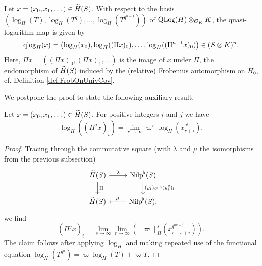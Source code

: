 \documentclass[../main.tex]{subfiles}
\begin{document}
\begin{prop}\label{prop:qlogmapExplicit}
  Let $x = (x_0, x_1, \dots) \in \Tilde H(S)$. With respect to the basis
  $(\log_H(T),\allowbreak \log_H(T^q), \allowbreak \dots, \allowbreak \log_H(T^{q^{n-1}}))$ of 
  $\QLog(H) \otimes_{\cO_K} K$, the quasi-logarithm map is given by
  \begin{equation*}
    \qlog_H(x) = \left(\log_H(x_0), \log_H((\Pi x)_0), \dots, \log_H((\Pi^{n-1}
    x)_0)\right) \in (S\otimes K)^n.
  \end{equation*}
  Here, $\Pi x = ((\Pi x)_0, (\Pi x)_1, \dots)$ is the image of $x$ under
  $\Pi$, the endomorphism of $\Tilde
  H(S)$ induced by the (relative) Frobenius automorphism on $H_0$, cf. Definition
  \ref{def:FrobOnUnivCov}.
\end{prop}
We postpone the proof to state the following auxiliary result.
\begin{lem}\label{lem:FrobOnTildeHExpl}
  Let $x = (x_0 ,x_1, \dots) \in \Tilde H(S)$. For positive integers $i$ and
  $j$ we have
  \begin{equation*}
    \log_H((\Pi^j x)_i) = \lim_{r \to \infty} \varpi^r \log_H(x_{r+i}^{q^j}).
  \end{equation*}
\begin{proof}
  Tracing through the commutative square (with $\lambda$ and $\mu$ the
  isomorphisms from the previous subsection)
    \begin{equation*}
    \begin{tikzcd}[ampersand replacement=\&]
    	{\Tilde H(S)} \& {\Nilp^\flat(S)} \\
    	{\Tilde H(S)} \& {\Nilp^\flat(S),}
    	\arrow["\lambda", from=1-1, to=1-2]
    	\arrow["\Pi", from=1-1, to=2-1]
    	\arrow["{(y_i)_i \mapsto (y_i^{q})_i}", from=1-2, to=2-2]
    	\arrow["\mu"', from=2-2, to=2-1]
    \end{tikzcd}
    \end{equation*}
    we find 
    \begin{equation} \label{eq:CompsOfPiExplicit}
      (\Pi^j x)_i = \lim_{s \to \infty} \lim_{r\to\infty} \left([\varpi]_H^s
      (x_{r+s+i}^{q^{nr + j}})\right).
    \end{equation}
    The claim follows after applying $\log_H$ and making repeated use of the
    functional equation $\log_H(T^{q^n}) = \varpi \log_H(T) + \varpi T$.
\end{proof}
\end{lem}
\end{document}
